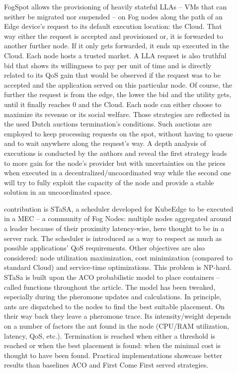 \documentclass[11pt]{sdm}
\begin{document}
\begin{description}
	\item[] FogSpot allows the provisioning of heavily stateful \glspl{LLA} -- \glspl{VM} that can neither be migrated nor suspended -- on Fog nodes along the path of an Edge device's request to its default execution location: the Cloud. That way either the request is accepted and provisioned or, it is forwarded to another further node. If it only gets forwarded, it ends up executed in the Cloud. 
	Each node hosts a trusted market. A \gls{LLA} request is also truthful bid that shows its willingness to pay per unit of time and is directly related to its \gls{QoS} gain that would be observed if the request was to be accepted and the application served on this particular node. Of course, the further the request is from the edge, the lower the bid and the utility gets, until it finally reaches 0 and the Cloud.
	Each node can either choose to maximize its revenue or its social welfare. Those strategies are reflected in the used Dutch auctions termination's conditions. Such auctions are employed to keep processing requests on the spot, without having to queue and to wait anywhere along the request's way. A depth analysis of executions is conducted by the authors and reveal the first strategy leads to more gain for the node's provider but with uncertainties on the prices when executed in a decentralized/uncoordinated way while the second one will try to fully exploit the capacity of the node and provide a stable solution in an uncoordinated space.
	
	\item[] contribution is STaSA, a scheduler developed for KubeEdge to be executed in a \gls{MEC} -- a community of Fog Nodes: multiple nodes aggregated around a leader because of their proximity latency-wise, here thought to be in a server rack. The scheduler is introduced as a way to respect as much as possible applications' \gls{QoS} requirements. Other objectives are also considered: node utilization maximization, cost minimization (compared to standard Cloud) and service-time optimizations. This problem is NP-hard. STaSa is built upon the \gls{ACO} probabilistic model to place containers -- called functions throughout the article. The model has been tweaked, especially during the pheromone updates and calculations. In principle, ants are dispatched to the nodes to find the best suitable placement. On their way back they leave a pheromone trace. Its intensity/weight depends on a number of factors the ant found in the node (CPU/RAM utilization, latency, QoS, etc.). Termination is reached when either a threshold is reached or when the best placement is found: when the minimal cost is thought to have been found. Practical implementations showcase better results than baselines \gls{ACO} and First Come First served strategies.
	

\end{description}
\end{document}
